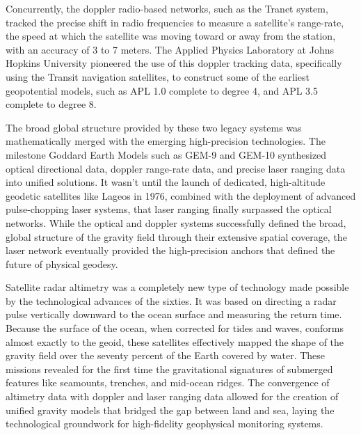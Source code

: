 Concurrently, the doppler radio-based networks, such as the Tranet system, tracked the precise shift in radio frequencies to measure a satellite's range-rate, the speed at which the satellite was moving toward or away from the station, with an accuracy of 3 to 7 meters. The Applied Physics Laboratory at Johns Hopkins University pioneered the use of this doppler tracking data, specifically using the Transit navigation satellites, to construct some of the earliest geopotential models, such as APL 1.0 complete to degree 4, and APL 3.5 complete to degree 8.

The broad global structure provided by these two legacy systems was mathematically merged with the emerging high-precision technologies. The milestone Goddard Earth Models such as GEM-9 and GEM-10 synthesized optical directional data, doppler range-rate data, and precise laser ranging data into unified solutions. It wasn't until the launch of dedicated, high-altitude geodetic satellites like Lageos in 1976, combined with the deployment of advanced pulse-chopping laser systems, that laser ranging finally surpassed the optical networks. While the optical and doppler systems successfully defined the broad, global structure of the gravity field through their extensive spatial coverage, the laser network eventually provided the high-precision anchors that defined the future of physical geodesy.

Satellite radar altimetry was a completely new type of technology made possible by the technological advances of the sixties. It was based on directing a radar pulse vertically downward to the ocean surface and measuring the return time. Because the surface of the ocean, when corrected for tides and waves, conforms almost exactly to the geoid, these satellites effectively mapped the shape of the gravity field over the seventy percent of the Earth covered by water. These missions revealed for the first time the gravitational signatures of submerged features like seamounts, trenches, and mid-ocean ridges. The convergence of altimetry data with doppler and laser ranging data allowed for the creation of unified gravity models that bridged the gap between land and sea, laying the technological groundwork for high-fidelity geophysical monitoring systems.

